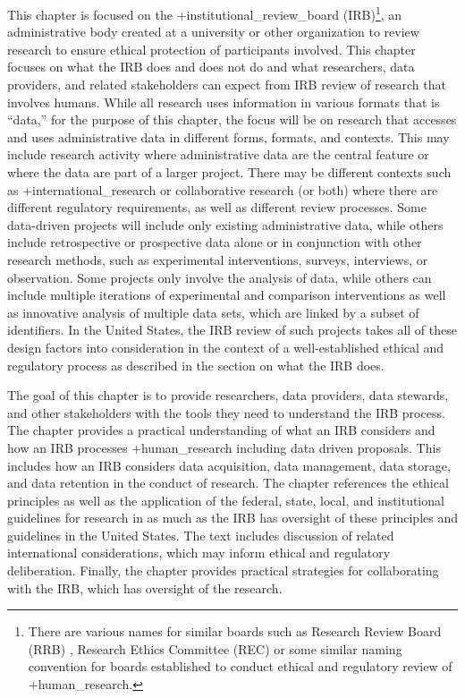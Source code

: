 \documentclass[
]{book}
\begin{document}
This chapter is focused on the +institutional\_review\_board\textbar{} (IRB)\footnote{There are various names for similar boards such as Research Review Board (RRB) \citet{chicagopublicschools2020}, Research Ethics Committee (REC) \citet{nhshealthresearchauthority2020} or some similar naming convention for boards established to conduct ethical and regulatory review of +human\_research\textbar.}, an administrative body created at a university or other organization to review research to ensure ethical protection of participants involved. This chapter focuses on what the IRB does and does not do and what researchers, data providers, and related stakeholders can expect from IRB review of research that involves humans. While all research uses information in various formats that is ``data,'' for the purpose of this chapter, the focus will be on research that accesses and uses administrative data in different forms, formats, and contexts. This may include research activity where administrative data are the central feature or where the data are part of a larger project. There may be different contexts such as +international\_research\textbar{} or collaborative research (or both) where there are different regulatory requirements, as well as different review processes. Some data-driven projects will include only existing administrative data, while others include retrospective or prospective data alone or in conjunction with other research methods, such as experimental interventions, surveys, interviews, or observation. Some projects only involve the analysis of data, while others can include multiple iterations of experimental and comparison interventions as well as innovative analysis of multiple data sets, which are linked by a subset of identifiers. In the United States, the IRB review of such projects takes all of these design factors into consideration in the context of a well-established ethical and regulatory process as described in the section on what the IRB does.

The goal of this chapter is to provide researchers, data providers, data stewards, and other stakeholders with the tools they need to understand the IRB process. The chapter provides a practical understanding of what an IRB considers and how an IRB processes +human\_research\textbar{} including data driven proposals. This includes how an IRB considers data acquisition, data management, data storage, and data retention in the conduct of research. The chapter references the ethical principles as well as the application of the federal, state, local, and institutional guidelines for research in as much as the IRB has oversight of these principles and guidelines in the United States. The text includes discussion of related international considerations, which may inform ethical and regulatory deliberation. Finally, the chapter provides practical strategies for collaborating with the IRB, which has oversight of the research.
\end{document}
